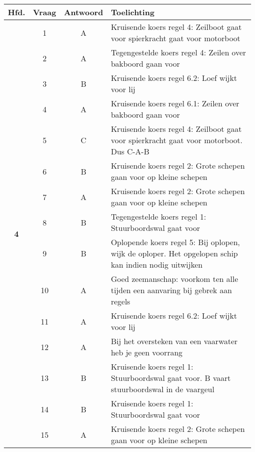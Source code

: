 \begin{table}[h]
	\centering
	\begin{tabular}{c|c|c|m{9.5cm}}
		\textbf{Hfd.}       & \textbf{Vraag} & \textbf{Antwoord} & \textbf{Toelichting} \\ \hline 
		\multirow{16}{*}{\sffamily\bfseries{\textcolor{ocre}{\LARGE4}} } & 1 & A & Kruisende koers regel 4: Zeilboot gaat voor spierkracht gaat voor motorboot\\ \cline{2-4} 
		& 2 & A & Tegengestelde koers regel 4: Zeilen over bakboord gaan voor \\ \cline{2-4} 
		& 3 & B & Kruisende koers regel 6.2: Loef wijkt voor lij \\ \cline{2-4} 
		& 4 & A & Kruisende koers regel 6.1: Zeilen over bakboord gaan voor \\ \cline{2-4} 
		& 5 & C & Kruisende koers regel 4: Zeilboot gaat voor spierkracht gaat voor motorboot. Dus C-A-B \\ \cline{2-4} 
		& 6 & B & Kruisende koers regel 2: Grote schepen gaan voor op kleine schepen \\ \cline{2-4} 
		& 7 & A &Kruisende koers regel 2: Grote schepen gaan voor op kleine schepen \\ \cline{2-4} 
		& 8 & B & Tegengestelde koers regel 1: Stuurboordswal gaat voor \\ \cline{2-4} 
		& 9 & B & Oplopende koers regel 5: Bij oplopen, wijk de oploper. Het opgelopen schip kan indien nodig uitwijken\\ \cline{2-4} 
		& 10 & A & Goed zeemanschap: voorkom ten alle tijden een aanvaring bij gebrek aan regels \\ \cline{2-4} 
		& 11 & A & Kruisende koers regel 6.2: Loef wijkt voor lij \\ \cline{2-4} 
		& 12 & A & Bij het oversteken van een vaarwater heb je geen voorrang \\ \cline{2-4} 
		& 13 & B & Kruisende koers regel 1: Stuurboordswal gaat voor. B vaart stuurboordswal in de vaargeul\\ \cline{2-4} 
		& 14 & B & Kruisende koers regel 1: Stuurboordswal gaat voor \\ \cline{2-4} 
		& 15 & A & Kruisende koers regel 2: Grote schepen gaan voor op kleine schepen \\ 
	\end{tabular}
\end{table}



